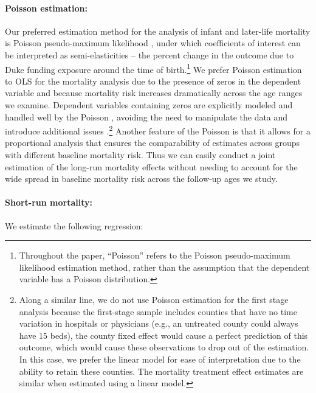 \documentclass[12pt]{article}
\begin{document}
\noindent \paragraph{Poisson estimation:} 
Our preferred estimation method for the analysis of infant and later-life mortality is Poisson pseudo-maximum likelihood , under which coefficients of interest can be interpreted as semi-elasticities -- the percent change in the outcome due to Duke funding exposure around the time of birth.\footnote{Throughout the paper, ``Poisson'' refers to the Poisson pseudo-maximum likelihood estimation method, rather than the assumption that the dependent variable has a Poisson distribution.} 
We prefer Poisson estimation to OLS for the mortality analysis due to the presence of zeros in the dependent variable and because mortality risk  increases dramatically across the age ranges we examine. 
Dependent variables containing zeros are explicitly modeled and handled well by the Poisson , avoiding the need to manipulate the data and introduce additional issues .\footnote{Along a similar line, we do not use Poisson estimation for the first stage analysis because the first-stage sample includes counties that have no time variation in hospitals or physicians (e.g., an untreated county could always have 15 beds), the county fixed effect would cause a perfect prediction of this outcome, which would cause these observations to drop out of the estimation. 
In this case, we prefer the linear model for ease of interpretation due to the ability to retain these counties. The mortality treatment effect estimates are similar when estimated using a linear model.} 
Another feature of the Poisson is that it allows for a proportional analysis that ensures the comparability of estimates across groups with different baseline mortality risk. Thus we can easily conduct a joint estimation of the long-run mortality effects without needing to account for the wide spread in baseline mortality risk across the follow-up ages we study. 

\noindent \paragraph{Short-run mortality:} We estimate the following regression:
\end{document}
